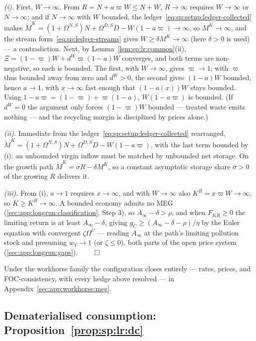\emph{(i).} First, $W\to\infty$. From $R=N+a\varpi W\le N+W$, $R\to\infty$ requires
$W\to\infty$ or $N\to\infty$; and if $N\to\infty$ with $W$ bounded, the
ledger~\eqref{eq:sp:setup:ledger-collected} makes
$\dot M^K=\left(1+\Omega^{N,S}\right)N+\Omega^{D,S}D-W\left(1-a\varpi\right)\to\infty$, so
$M^K\to\infty$, and the stream form~\eqref{eq:sp:ledger-streams} gives
$W\ge\delta M^K\to\infty$ (here $\delta>0$ is used) --- a contradiction. Next, by
Lemma~\ref{lem:sp:lr:common}(ii),
$\Xi=\left(1-\varpi\right)W+d^W\varpi\left(1-a\right)W$ converges, and both terms are
non-negative, so each is bounded. The first, with $W\to\infty$, gives $\varpi\to1$; with
$\varpi$ thus bounded away from zero and $d^W>0$, the second gives $\left(1-a\right)W$
bounded, hence $a\to1$, with $x\to\infty$ fast enough that
$\left(1-a\left(x\right)\right)W$ stays bounded. Using
$1-a\varpi=\left(1-\varpi\right)+\varpi\left(1-a\right)$, $W\left(1-a\varpi\right)$ is
bounded. (If $d^W=0$ the argument only forces $\left(1-\varpi\right)W$ bounded --- treated
waste emits nothing --- and the recycling margin is disciplined by prices alone.)

\emph{(ii).} Immediate from the ledger~\eqref{eq:sp:setup:ledger-collected} rearranged,
$\dot M^K=\left(1+\Omega^{N,S}\right)N+\Omega^{D,S}D-W\left(1-a\varpi\right)$, with the last
term bounded by (i): an unbounded virgin inflow must be matched by unbounded net storage. On
the growth path $\dot M^K=\sigma R-\delta M^K$, so a constant asymptotic storage share
$\bar\sigma>0$ of the growing $R$ delivers it.

\emph{(iii).} From (i), $a\to1$ requires $x\to\infty$, and with $W\to\infty$ also
$K^R=x\varpi W\to\infty$, so $K\ge K^R\to\infty$. A bounded economy admits no MEG
(\ref{sec:app:longrun:classification}, Step 3), so $A_\infty-\delta>\rho$, and when
$F_{KR}\ge0$ the limiting return is at least $A_\infty-\delta$, giving
$g_C\ge\left(A_\infty-\delta-\rho\right)/\eta$ by the Euler equation with convergent
$\zeta\Omega^C$ --- reading $A_\infty$ at the path's limiting pollution stock and presuming
$w_Y\to1$ (or $\zeta\le0$), both parts of the open price system
(\ref{sec:app:longrun:gaps}). \hfill$\qed$

\medskip
Under the workhorse family the configuration closes entirely --- rates, prices, and
FOC-consistency, with every hedge above resolved --- in Appendix~\ref{sec:app:workhorse:meg}.

\subsection{Dematerialised consumption: Proposition~\ref{prop:sp:lr:dc}}
\label{sec:app:longrun:dc}


